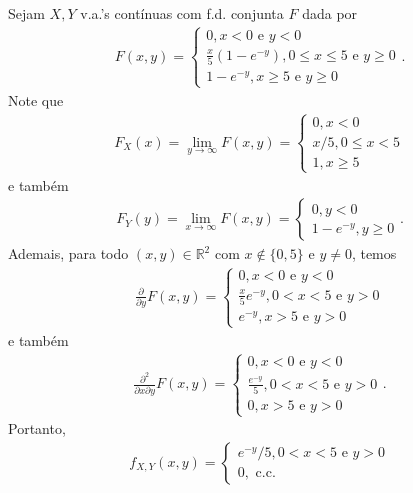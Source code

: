 \documentclass[../Notas.tex]{subfiles}
\begin{document}
\begin{example}
Sejam $X, Y$ v.a.'s contínuas com f.d. conjunta $F$ dada por
\begin{align*}
    F(x,y) = \begin{cases}
    0, x<0 \text{ e } y<0 \\
    \frac{x}{5}(1 - e^{-y}), 0\leq x\leq 5 \text{ e } y\geq 0 \\
    1 - e^{-y}, x\geq 5 \text{ e } y\geq 0
    \end{cases}.
\end{align*}
Note que
\begin{align*}
    F_X(x) = \lim_{y\to\infty} F(x,y) = \begin{cases}
    0, x < 0 \\
    x/5, 0\leq x < 5 \\
    1, x\geq 5
    \end{cases}
\end{align*}
e também
\begin{align*}
    F_Y(y) = \lim_{x\to\infty} F(x,y) = \begin{cases}
    0, y < 0 \\
    1 - e^{-y}, y\geq 0
    \end{cases}.
\end{align*}
Ademais, para todo $(x,y)\in\mathbb{R}^2$ com $x\notin\{0,5\}$ e $y\neq 0$, temos
\begin{align*}
    \frac{\partial}{\partial y}F(x,y) = \begin{cases}
    0, x < 0 \text{ e } y < 0 \\
    \frac{x}{5}e^{-y}, 0 < x < 5 \text{ e } y > 0 \\
    e^{-y}, x > 5 \text{ e } y>0
    \end{cases}
\end{align*}
e também
\begin{align*}
    \frac{\partial^2}{\partial x\partial y}F(x,y) = \begin{cases}
    0, x < 0 \text{ e } y < 0 \\
    \frac{e^{-y}}{5}, 0 < x < 5 \text{ e } y > 0 \\
    0, x > 5 \text{ e } y>0
    \end{cases}.
\end{align*}
Portanto, 
\begin{align*}
    f_{X,Y}(x,y) = \begin{cases}
    e^{-y}/5, 0 < x < 5 \text{ e } y > 0 \\
    0, \text{ c.c.}
    \end{cases}

\end{align*}
\end{example}
\end{document}
